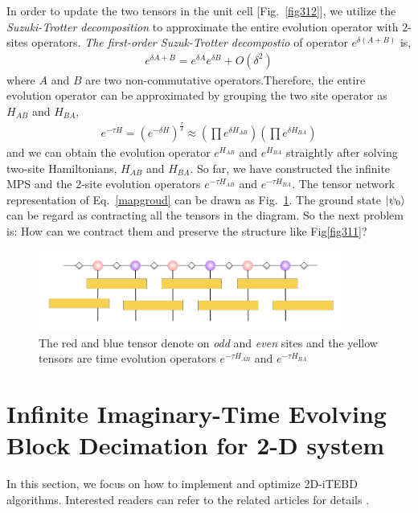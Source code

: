 In order to update the two tensors in the unit cell [Fig.~\ref{fig312}], we utilize the \textit{Suzuki-Trotter decomposition} to approximate the entire evolution operator with $2$-sites operators. \textit{The first-order Suzuk-Trotter decompostio} of operator $e^{\delta (A+B)}$ is,
\begin{align}
	\label{STd}
	e^{\delta A + B} = e^{\delta A}e^{\delta B} + O(\delta^2)
\end{align}
where $A$ and $B$ are two non-commutative operators.Therefore, the entire evolution operator can be approximated by grouping the two site operator as $H_{AB}$ and $H_{BA}$,
\begin{align}
	\label{evoopt}
	e^{-\tau H} = \left(e^{-\delta H}\right)^{\frac{\tau}{\delta}} \approx \left(\prod e^{\delta H_{AB}} \right)\left( \prod e^{\delta H_{BA}}\right)
\end{align}
and we can obtain the evolution operator $e^{H_{AB}}$ and $e^{H_{BA}}$ straightly after solving two-site Hamiltonians, $H_{AB}$ and $H_{BA}$.
So far, we have constructed the infinite MPS and the 2-site evolution operators $e^{-\tau H_{AB}}$ and $e^{-\tau H_{BA}}$. The tensor network representation of Eq.~\ref{mapgroud} can be drawn as Fig.~\ref{fig313}. The ground state $\Ket{\psi_0}$ can be regard as contracting all the tensors in the diagram. So the next problem is: How can we contract them and preserve the structure like Fig{\ref{fig311}}?

\begin{figure}[ht]
	\centering
	\includegraphics[width=0.90\textwidth]{figures/fig312.png}
	\caption[The tensor diagram of imaginary time evolving block decimation.]{The red and blue tensor denote on \textit{odd} and \textit{even} sites and the yellow tensors are time evolution operators $e^{-\tau H_{AB}}$ and $e^{-\tau H_{BA}}$}
	\label{fig313}
\end{figure}
\section{Infinite Imaginary-Time Evolving Block Decimation for 2-D system}

In this section, we focus on how to implement and optimize 2D-iTEBD algorithms. Interested readers can refer to the related articles for details  \cite{PhysRevLett.99.220405, PhysRevLett.101.090603, PhysRevB.78.155117}.
\label{itebd}
